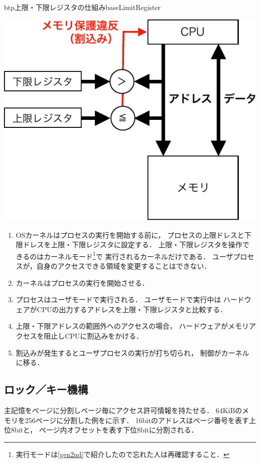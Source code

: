 \begin{myfig}{btp}{上限・下限レジスタの仕組み}{baseLimitRegister}
\begin{minipage}{0.49\columnwidth}
\begin{center}
      \includegraphics[scale=0.66]{Fig/baseLimitHardware-crop.pdf}
      \label{fig:baseLimitHardware}
    \end{center}
  \end{minipage}
\end{myfig}

\begin{enumerate}
\item OSカーネルはプロセスの実行を開始する前に，
  プロセスの上限ドレスと下限ドレスを上限・下限レジスタに設定する．
  上限・下限レジスタを操作できるのはカーネルモード\footnote{
    実行モードは\ref{gen2nd}で紹介したので忘れた人は再確認すること．}で
  実行されるカーネルだけである．
  ユーザプロセスが，自身のアクセスできる領域を変更することはできない．
\item カーネルはプロセスの実行を開始させる．
\item プロセスはユーザモードで実行される．
  ユーザモードで実行中は
  ハードウェアがCPUの出力するアドレスを上限・下限レジスタと比較する．
\item 上限・下限アドレスの範囲外へのアクセスの場合，
  ハードウェアがメモリアクセスを阻止しCPUに割込みをかける．
\item 割込みが発生するとユーザプロセスの実行が打ち切られ，
  制御がカーネルに移る．
\end{enumerate}

\subsection{ロック／キー機構}
主記憶をページに分割しページ毎にアクセス許可情報を持たせる．
64KiBのメモリを256ページに分割した例をに示す．
16bitのアドレスはページ番号を表す上位8bitと，
ページ内オフセットを表す下位8bitに分割される．

